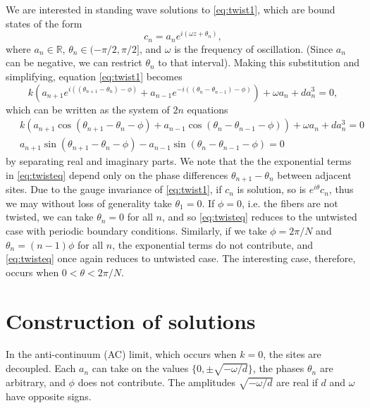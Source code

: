 \documentclass[12pt]{article}
\def\R{{\mathbb R}}
\begin{document}
We are interested in standing wave solutions to \cref{eq:twist1}, which are bound states of the form
\begin{equation}\label{eq:ansatz1}
c_n = a_n e^{i (\omega z + \theta_n) },
\end{equation}
where $a_n \in \R$, $\theta_n \in (-\pi/2, \pi/2]$, and $\omega$ is the frequency of oscillation. (Since $a_n$ can be negative, we can restrict $\theta_n$ to that interval). Making this substitution and simplifying, equation \cref{eq:twist1} becomes
\begin{equation}\label{eq:twisteq}
k\left( a_{n+1} e^{i((\theta_{n+1}-\theta_n)-\phi)} + a_{n-1} e^{-i((\theta_n - \theta_{n-1})-\phi)}\right) + \omega a_n + d a_n^3 = 0,
\end{equation}
which can be written as the system of $2n$ equations
\begin{equation}\label{eq:twisteqreal}
\begin{aligned}
&k\left( a_{n+1} \cos(\theta_{n+1}-\theta_n-\phi) + a_{n-1} \cos(\theta_n - \theta_{n-1}-\phi)\right) + \omega a_n + d a_n^3 = 0 \\\
&a_{n+1} \sin(\theta_{n+1}-\theta_n-\phi) - a_{n-1} \sin(\theta_n - \theta_{n-1}-\phi) = 0
\end{aligned}
\end{equation}
by separating real and imaginary parts. We note that the the exponential terms in \cref{eq:twisteq} depend only on the phase differences $\theta_{n+1}-\theta_n$ between adjacent sites. Due to the gauge invariance of \cref{eq:twist1}, if $c_n$ is solution, so is $e^{i \theta} c_n$, thus we may without loss of generality take $\theta_1 = 0$. If $\phi = 0$, i.e. the fibers are not twisted, we can take $\theta_n = 0$ for all $n$, and so \cref{eq:twisteq} reduces to the untwisted case with periodic boundary conditions. Similarly, if we take $\phi = 2 \pi/N$ and $\theta_n = (n-1)\phi$ for all $n$, the exponential terms do not contribute, and \cref{eq:twisteq} once again reduces to untwisted case. The interesting case, therefore, occurs when $0 < \theta < 2 \pi/N$. 

\section{Construction of solutions}

In the anti-continuum (AC) limit, which occurs when $k = 0$, the sites are decoupled. Each $a_n$ can take on the values $\{0, \pm \sqrt{-\omega/d} \}$, the phases $\theta_n$ are arbitrary, and $\phi$ does not contribute. The amplitudes $\sqrt{-\omega/d}$ are real if $d$ and $\omega$ have opposite signs.
\end{document}
